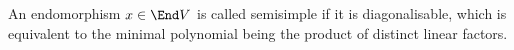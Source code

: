 An endomorphism $x \in \End V$ is called semisimple if it is diagonalisable, which
is equivalent to the minimal polynomial being the product of distinct linear
factors.
